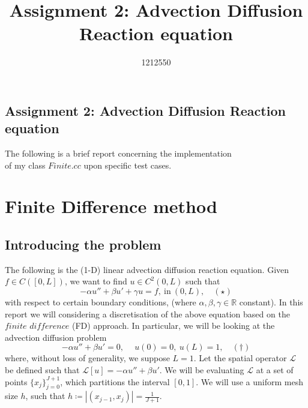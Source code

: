 \documentclass[10pt]{article}
\begin{document}
\title{Assignment 2: Advection Diffusion Reaction equation}
\author{1212550}
\begin{center}
\section*{Assignment 2: Advection Diffusion Reaction equation}


The following is a brief report concerning the implementation\\ of my class $\textit{Finite.cc}$ upon specific test cases.\\
\end{center}

\section{Finite Difference method}

\subsection{Introducing the problem}

The following is the (1-D) linear advection diffusion reaction equation. Given $f \in C([0,L])$, we want to find $u \in C^2(0,L)$ such that
\[ -\alpha u'' + \beta u' + \gamma u = f,~\text{in}~(0,L), \quad (\star)\]
with respect to certain boundary conditions, (where $\alpha,\beta,\gamma \in \mathbb{R}$ constant). In this report we will considering a discretisation of the above equation based on the $\textit{finite difference}$ (FD) approach. In particular, we will be looking at the advection diffusion problem
\[ -\alpha u'' + \beta u' = 0,~\quad u(0)=0,~u(L)=1, \quad(\dagger) \]
where, without loss of generality, we suppose $L=1$. Let the spatial operator $\mathcal{L}$ be defined such that $\mathcal{L}[u] =  -\alpha u'' + \beta u'$. We will be evaluating $\mathcal{L}$ at a set of points $\{ x_j \}_{j=0}^{J+1}$, which partitions the interval $[0,1]$. We will use a uniform mesh size $h$, such that $h \coloneqq |(x_{j-1},x_j)| = \frac{1}{J+1}$.
\end{document}
